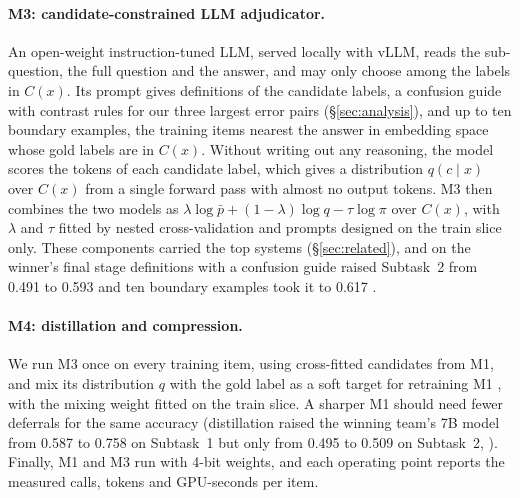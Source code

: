 \paragraph{M3: candidate-constrained LLM adjudicator.}
An open-weight instruction-tuned LLM, served locally with vLLM, reads the sub-question, the full question and the answer, and may only choose among the labels in $C(x)$.
Its prompt gives definitions of the candidate labels, a confusion guide with contrast rules for our three largest error pairs (\S\ref{sec:analysis}), and up to ten boundary examples, the training items nearest the answer in embedding space whose gold labels are in $C(x)$.
Without writing out any reasoning, the model scores the tokens of each candidate label, which gives a distribution $q(c \mid x)$ over $C(x)$ from a single forward pass with almost no output tokens.
M3 then combines the two models as $\lambda \log \bar p + (1-\lambda)\log q - \tau \log \pi$ over $C(x)$, with $\lambda$ and $\tau$ fitted by nested cross-validation and prompts designed on the train slice only.
These components carried the top systems (\S\ref{sec:related}), and on the winner's final stage definitions with a confusion guide raised Subtask~2 from 0.491 to 0.593 and ten boundary examples took it to 0.617 \citep{shi-etal-2026-teleai}.

\paragraph{M4: distillation and compression.}
We run M3 once on every training item, using cross-fitted candidates from M1, and mix its distribution $q$ with the gold label as a soft target for retraining M1 \citep{hinton2015distilling}, with the mixing weight fitted on the train slice.
A sharper M1 should need fewer deferrals for the same accuracy (distillation raised the winning team's 7B model from 0.587 to 0.758 on Subtask~1 but only from 0.495 to 0.509 on Subtask~2, \citealp{shi-etal-2026-teleai}).
Finally, M1 and M3 run with 4-bit weights, and each operating point reports the measured calls, tokens and GPU-seconds per item.
